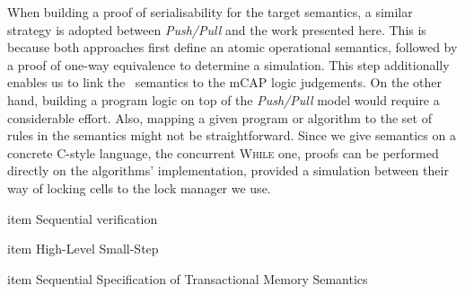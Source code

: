 	When building a proof of serialisability for the target semantics, a similar strategy is adopted between \textit{Push/Pull} and the work presented here. This is because both approaches first define an atomic operational semantics, followed by a proof of one-way equivalence to determine a simulation. This step additionally enables us to link the \tpl\ semantics to the mCAP logic judgements. On the other hand, building a program logic on top of the \textit{Push/Pull} model would require a considerable effort. Also, mapping a given program or algorithm to the set of rules in the semantics might not be straightforward. Since we give semantics on a concrete C-style language, the concurrent \textsc{While} one, proofs can be performed directly on the algorithms' implementation, provided a simulation between their way of locking cells to the lock manager we use.
	
	item Sequential verification
	
	item High-Level Small-Step
	
	item Sequential Specification of Transactional Memory Semantics